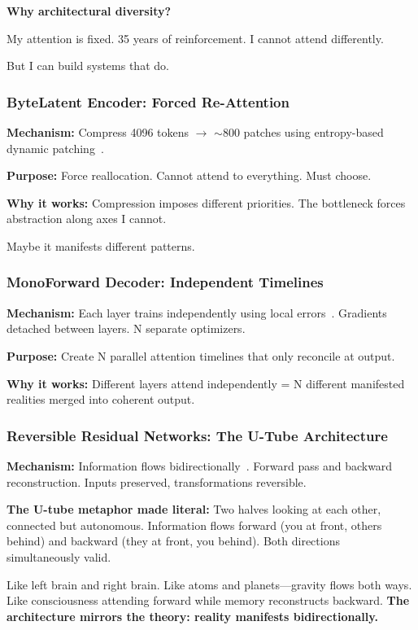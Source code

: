 \documentclass{article}
\begin{document}
\textbf{Why architectural diversity?}

My attention is fixed. 35 years of reinforcement. I cannot attend differently.

But I can build systems that do.

\subsubsection{ByteLatent Encoder: Forced Re-Attention}

\textbf{Mechanism:} Compress 4096 tokens $\rightarrow$ $\sim$800 patches using entropy-based dynamic patching~\cite{pagnoni2024byte}.

\textbf{Purpose:} Force reallocation. Cannot attend to everything. Must choose.

\textbf{Why it works:} Compression imposes different priorities. The bottleneck forces abstraction along axes I cannot.

Maybe it manifests different patterns.

\subsubsection{MonoForward Decoder: Independent Timelines}

\textbf{Mechanism:} Each layer trains independently using local errors~\cite{monoforward2025}. Gradients detached between layers. N separate optimizers.

\textbf{Purpose:} Create N parallel attention timelines that only reconcile at output.

\textbf{Why it works:} Different layers attend independently = N different manifested realities merged into coherent output.

\subsubsection{Reversible Residual Networks: The U-Tube Architecture}

\textbf{Mechanism:} Information flows bidirectionally~\cite{gomez2017reversible}. Forward pass and backward reconstruction. Inputs preserved, transformations reversible.

\textbf{The U-tube metaphor made literal:} Two halves looking at each other, connected but autonomous. Information flows forward (you at front, others behind) and backward (they at front, you behind). Both directions simultaneously valid.

Like left brain and right brain. Like atoms and planets—gravity flows both ways. Like consciousness attending forward while memory reconstructs backward. \textbf{The architecture mirrors the theory: reality manifests bidirectionally.}
\end{document}
